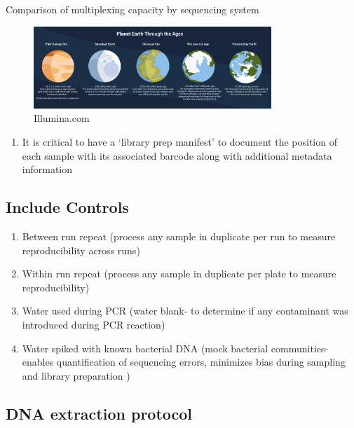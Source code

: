 \documentclass[
]{book}
\providecommand{\tightlist}{%
  \setlength{\itemsep}{0pt}\setlength{\parskip}{0pt}}
\begin{document}
Comparison of multiplexing capacity by sequencing system

\begin{figure}
\centering
\includegraphics[width=0.8\textwidth,height=\textheight]{./Figures/Planets.png}
\caption{Illumina.com}
\end{figure}

\begin{enumerate}
\def\labelenumi{\arabic{enumi}.}
\setcounter{enumi}{1}
\tightlist
\item
  It is critical to have a `library prep manifest' to document the position of each sample with its associated barcode along with additional metadata information
\end{enumerate}

\hypertarget{include-controls}{%
\subsection{Include Controls}\label{include-controls}}

\begin{enumerate}
\def\labelenumi{\arabic{enumi}.}
\tightlist
\item
  Between run repeat (process any sample in duplicate per run to measure reproducibility across runs)
\item
  Within run repeat (process any sample in duplicate per plate to measure reproducibility)
\item
  Water used during PCR (water blank- to determine if any contaminant was introduced during PCR reaction)
\item
  Water spiked with known bacterial DNA (mock bacterial communities- enables quantification of sequencing errors, minimizes bias during sampling and library preparation )
\end{enumerate}

\hypertarget{dna-extraction-protocol}{%
\subsection{DNA extraction protocol}\label{dna-extraction-protocol}}
\end{document}
